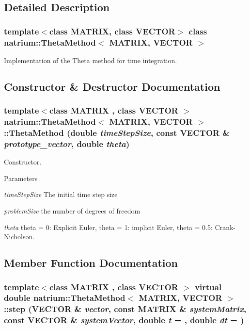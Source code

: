 \subsection{Detailed Description}
\subsubsection*{template$<$class MATRIX, class VECTOR$>$ class natrium::ThetaMethod$<$ MATRIX, VECTOR $>$}

Implementation of the Theta method for time integration. 

\subsection{Constructor \& Destructor Documentation}
\hypertarget{classnatrium_1_1ThetaMethod_a7b5ec1aa8b646768c45cc422651ec905}{
\subsubsection[{ThetaMethod}]{\setlength{\rightskip}{0pt plus 5cm}template$<$class MATRIX , class VECTOR $>$ {\bf natrium::ThetaMethod}$<$ MATRIX, VECTOR $>$::{\bf ThetaMethod} (double {\em timeStepSize}, \/  const VECTOR \& {\em prototype\_\-vector}, \/  double {\em theta})}}
\label{classnatrium_1_1ThetaMethod_a7b5ec1aa8b646768c45cc422651ec905}


Constructor. 
\begin{DoxyParams}{Parameters}
\item[{\em timeStepSize}]The initial time step size \item[{\em problemSize}]the number of degrees of freedom \item[{\em theta}]theta = 0: Explicit Euler, theta = 1: implicit Euler, theta = 0.5: Crank-\/Nicholson. \end{DoxyParams}


\subsection{Member Function Documentation}
\hypertarget{classnatrium_1_1ThetaMethod_a247c639f49a05904dae01b05115bc7e4}{
\subsubsection[{step}]{\setlength{\rightskip}{0pt plus 5cm}template$<$class MATRIX , class VECTOR $>$ virtual double {\bf natrium::ThetaMethod}$<$ MATRIX, VECTOR $>$::step (VECTOR \& {\em vector}, \/  const MATRIX \& {\em systemMatrix}, \/  const VECTOR \& {\em systemVector}, \/  double {\em t} = {}, \/  double {\em dt} = {})}}
\label{classnatrium_1_1ThetaMethod_a247c639f49a05904dae01b05115bc7e4}


